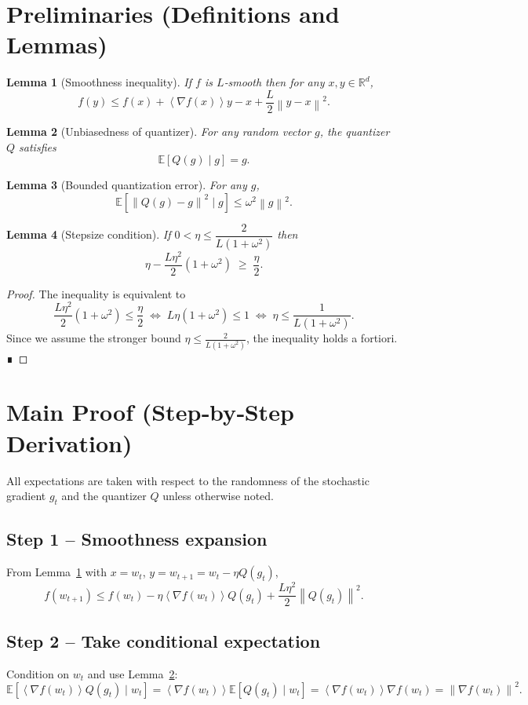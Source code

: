 \documentclass{article}
\newtheorem{lemma}{Lemma}
\newcommand{\E}{\mathbb{E}}
\newcommand{\R}{\mathbb{R}}
\newcommand{\norm}[1]{\left\lVert#1\right\rVert}
\newcommand{\inner}[1]{\left\langle#1\right\rangle}
\begin{document}
\section*{Preliminaries (Definitions and Lemmas)}
\begin{lemma}[Smoothness inequality]\label{lem:smooth}
If $f$ is $L$‑smooth then for any $x,y\in\R^{d}$,
\[
f(y)\le f(x)+\inner{\nabla f(x)}{y-x}+\frac{L}{2}\norm{y-x}^{2}.
\]
\end{lemma}
\begin{lemma}[Unbiasedness of quantizer]\label{lem:unbiased}
For any random vector $g$, the quantizer $Q$ satisfies
\[
\E[Q(g)\mid g]=g.
\]
\end{lemma}
\begin{lemma}[Bounded quantization error]\label{lem:quantvar}
For any $g$,
\[
\E\!\left[\norm{Q(g)-g}^{2}\mid g\right]\le\omega^{2}\norm{g}^{2}.
\]
\end{lemma}
\begin{lemma}[Stepsize condition]\label{lem:stepsize}
If $0<\eta\le \dfrac{2}{L(1+\omega^{2})}$ then
\[
\eta-\frac{L\eta^{2}}{2}(1+\omega^{2})\;\ge\;\frac{\eta}{2}.
\]
\end{lemma}
\begin{proof}
The inequality is equivalent to
\[
\frac{L\eta^{2}}{2}(1+\omega^{2})\le\frac{\eta}{2}
\;\Longleftrightarrow\;
L\eta(1+\omega^{2})\le 1
\;\Longleftrightarrow\;
\eta\le\frac{1}{L(1+\omega^{2})}.
\]
Since we assume the stronger bound $\eta\le\frac{2}{L(1+\omega^{2})}$, the inequality holds a fortiori.  ∎
\end{proof}

\section*{Main Proof (Step‑by‑Step Derivation)}
All expectations are taken with respect to the randomness of the stochastic gradient $g_{t}$ and the quantizer $Q$ unless otherwise noted.

\subsection*{Step 1 – Smoothness expansion}
From Lemma~\ref{lem:smooth} with $x=w_{t}$, $y=w_{t+1}=w_{t}-\eta Q(g_{t})$,
\[
f(w_{t+1})\le f(w_{t})-\eta\inner{\nabla f(w_{t})}{Q(g_{t})}
+\frac{L\eta^{2}}{2}\norm{Q(g_{t})}^{2}. \tag{6}
\]

\subsection*{Step 2 – Take conditional expectation}
Condition on $w_{t}$ and use Lemma~\ref{lem:unbiased}:
\[
\E\!\left[\inner{\nabla f(w_{t})}{Q(g_{t})}\mid w_{t}\right]
= \inner{\nabla f(w_{t})}{\E[Q(g_{t})\mid w_{t}]}
= \inner{\nabla f(w_{t})}{\nabla f(w_{t})}
= \norm{\nabla f(w_{t})}^{2}. \tag{7}
\]
\end{document}
